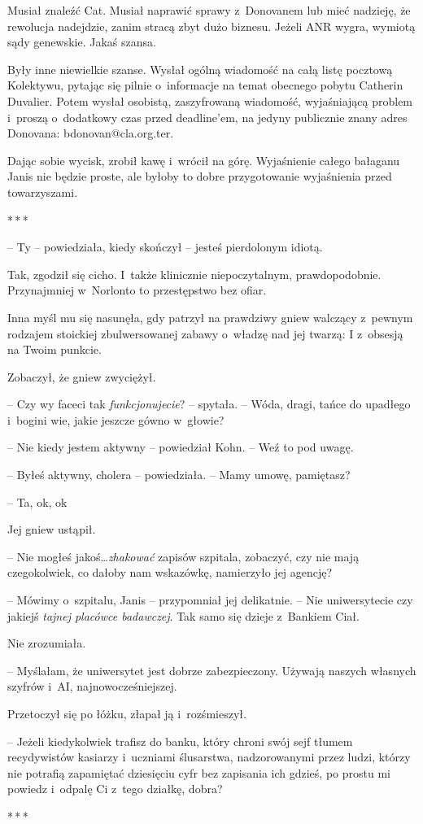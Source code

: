\documentclass[oneside,polish,11pt,sfheadings]{mwbk}
\newcommand{\threeast}{\bigskip\par\centerline{*\,*\,*}\medskip\par}%
\begin{document}
Musiał znaleźć Cat. Musiał naprawić sprawy z~Donovanem lub mieć
nadzieję, że rewolucja nadejdzie, zanim stracą zbyt dużo biznesu. Jeżeli
ANR wygra, wymiotą sądy genewskie. Jakaś szansa.

Były inne niewielkie szanse. Wysłał ogólną wiadomość na całą listę
pocztową Kolektywu, pytając się pilnie o~informacje na temat obecnego
pobytu Catherin Duvalier. Potem wysłał osobistą, zaszyfrowaną wiadomość,
wyjaśniającą problem i~proszą o~dodatkowy czas przed deadline'em, na
jedyny publicznie znany adres Donovana: bdonovan@cla.org.ter.

Dając sobie wycisk, zrobił kawę i~wrócił na górę. Wyjaśnienie całego
bałaganu Janis nie będzie proste, ale byłoby to dobre przygotowanie
wyjaśnienia przed towarzyszami.
  \threeast 

-- Ty -- powiedziała, kiedy skończył -- jesteś pierdolonym idiotą.

Tak, zgodził się cicho. I~także klinicznie niepoczytalnym,
prawdopodobnie. Przynajmniej w~Norlonto to przestępstwo bez ofiar.

Inna myśl mu się nasunęła, gdy patrzył na prawdziwy gniew walczący z~pewnym rodzajem stoickiej zbulwersowanej zabawy o~władzę nad jej twarzą:
I z~obsesją na Twoim punkcie.

Zobaczył, że gniew zwyciężył.

-- Czy wy faceci tak \emph{funkcjonujecie}? -- spytała. -- Wóda, dragi,
tańce do upadłego i~bogini wie, jakie jeszcze gówno w~głowie?

-- Nie kiedy jestem aktywny -- powiedział Kohn. -- Weź to pod uwagę.

-- Byłeś aktywny, cholera -- powiedziała. -- Mamy umowę, pamiętasz?

-- Ta, ok, ok

Jej gniew ustąpił. 

-- Nie mogłeś jakoś\ldots \emph{zhakować }zapisów
szpitala, zobaczyć, czy nie mają czegokolwiek, co dałoby nam wskazówkę,
namierzyło jej agencję?

-- Mówimy o~szpitalu, Janis -- przypomniał jej delikatnie. -- Nie
uniwersytecie czy jakiejś \emph{tajnej placówce badawczej}. Tak samo się
dzieje z~Bankiem Ciał.

Nie zrozumiała. 

-- Myślałam, że uniwersytet jest dobrze zabezpieczony.
Używają naszych własnych szyfrów i~AI, najnowocześniejszej.

Przetoczył się po łóżku, złapał ją i~rozśmieszył. 

-- Jeżeli kiedykolwiek
trafisz do banku, który chroni swój sejf tłumem recydywistów kasiarzy i~uczniami ślusarstwa, nadzorowanymi przez ludzi, którzy nie potrafią
zapamiętać dziesięciu cyfr bez zapisania ich gdzieś, po prostu mi
powiedz i~odpalę Ci z~tego działkę, dobra?
  \threeast 
\end{document}
